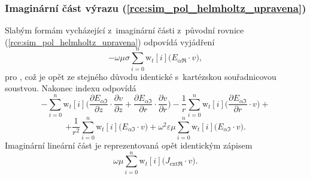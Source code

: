 \subsubsection*{Imaginární část výrazu (\ref{rce:sim_pol_helmholtz_upravena})}
Slabým formám vycházející z~imaginární části z~původní rovnice (\ref{rce:sim_pol_helmholtz_upravena}) odpovídá vyjádření
\begin{equation}
 -\omega\mu\sigma\sum_{i=0}^{n}\mathrm{w}_{t}[i]\bigg(E_{\alpha\Re}\cdot v\bigg),
	\label{rce:sim_pol_bilinear_imag_real} 
\end{equation}
pro , což je opět ze stejného důvodu identické s~kartézskou souřadnicovou soustvou. Nakonec indexu  odpovídá
\begin{displaymath}
-\sum_{i=0}^{n}\mathrm{w}_{t}[i]\bigg(\frac{\partial E_{\alpha\Im}}{\partial z}\cdot \frac{\partial v}{\partial z} + \frac{\partial E_{\alpha\Im}}{\partial r}\cdot \frac{\partial v}{\partial r} \bigg) - \frac{1}{r}\sum_{i=0}^{n}\mathrm{w}_{t}[i]\bigg(\frac{\partial E_{\alpha\Im}}{\partial r}\cdot v\bigg) +
\end{displaymath}
\begin{equation}
	 + \frac{1}{r^{2}}\sum_{i=0}^{n}\mathrm{w}_{t}[i]\bigg(E_{\alpha\Im}\cdot v\bigg) + \omega^{2}\varepsilon\mu\sum_{i=0}^{n}\mathrm{w}_{t}[i]\bigg(E_{\alpha\Im}\cdot v\bigg).
	\label{rce:sim_pol_bilinear_imag_imag} 
\end{equation}
Imaginární lineární část je reprezentovaná opět identickým zápisem
\begin{equation}
 \omega\mu\sum_{i=0}^{n}\mathrm{w}_{t}[i]\bigg(J_{\mathrm{ext}\Re}\cdot v\bigg).
	\label{rce:sim_pol_linear_imag_num} 
\end{equation}